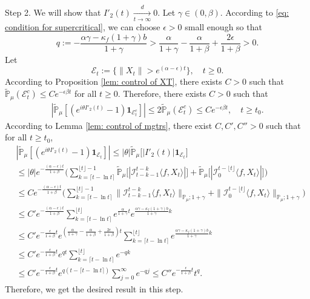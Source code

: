 \documentclass[12pt,a4paper]{amsart}
\theoremstyle{plain}
\theoremstyle{definition}
\numberwithin{equation}{section}
\begin{document}
	Step 2.
	We will show that $I'_2(t)\xrightarrow[t\to \infty]{d} 0$.
	Let $\gamma \in (0,\beta)$.
	According to \eqref{eq: condition for supercritical}, we can choose $\epsilon > 0$ small enough so that
\[
	q:= - \frac{\alpha \gamma-\kappa_f(1+\gamma)b}{1+\gamma}
	> \frac{\alpha}{1+\gamma}-\frac{\alpha}{1+\beta} + \frac{2\epsilon}{1+\beta} > 0.
\]
	Let
\[
	\mathcal E_t
	:=\{\|X_t\|>e^{(\alpha-\epsilon )t}\},
	\quad t\geq 0.
\]
	According to Proposition \ref{lem: control of XT}, there exists
	$C>0$ such that  $\mathbb{\tilde{P}}_{\mu}(\mathcal E_t^c)\leq C e^{-\epsilon \beta t}$
	for all $t\geq 0$.
	Therefore, there exists $C>0$ such that
\begin{equation}\begin{split}
    |\mathbb{\tilde{P}}_{\mu}[(e^{i\theta I'_2(t)}-1)\mathbf{1}_{\mathcal{E}^{c}_t}]|
    \leq 2\mathbb{\tilde{P}}_{\mu}(\mathcal{E}^c_t)\leq Ce^{-\epsilon \beta t},
    \quad t\geq t_0.
\end{split}\end{equation}
	According to Lemma \ref{lem: control of mgtrs}, there exist $C,C',C''>0$ such that for all
	$t\ge t_0$,
\begin{align*}
    &|\mathbb{\tilde{P}}_{\mu} [ (e^{i\theta I'_2(t)}-1)\mathbf{1}_{\mathcal{E}_t}]|
    \leq |\theta| \mathbb{\tilde{P}}_{\mu} \big[ |I'_2(t)|\mathbf{1}_{\mathcal{E}_t}\big]
    \\&\leq|\theta| e^{-\frac{(\alpha - \epsilon )t}{1+\beta}} \Big(\sum_{k=\lceil t-\ln t \rceil}^{\lfloor t \rfloor - 1}\mathbb{\tilde{P}}_{\mu}\big[| \mathcal{I}_{t-k-1}^{t-k}\langle f,X_t\rangle|\big] + \mathbb{\tilde{P}}_{\mu}\big[| \mathcal{I}_{0}^{t-\lfloor t\rfloor}\langle f,X_t\rangle|\big]\Big)
    \\& \leq C  e^{-\frac{(\alpha - \epsilon )t}{1+\beta}} \Big(\sum_{k=\lceil t-\ln t \rceil}^{\lfloor t \rfloor - 1}\|\mathcal{I}_{t-k-1}^{t-k}\langle f,X_t\rangle\|_{\mathbb P_\mu; 1+\gamma} + \|\mathcal I_0^{t-\lfloor t \rfloor} \langle f, X_t\rangle\|_{\mathbb P_\mu;1+\gamma}\Big)
    \\ &\leq C'  e^{-\frac{(\alpha - \epsilon )t}{1+\beta}} \sum_{k=\lceil t-\ln t \rceil}^{\lfloor t \rfloor}e^{\frac{\alpha}{1+\gamma}t}e^{\frac{\alpha\gamma-\kappa_f(1+\gamma)b}{1+\gamma}k}\\
    &\leq C'  e^{-\frac{\epsilon}{1+\beta} t}e^{(\frac{\alpha }{1+\gamma}-\frac{\alpha }{1+\beta} + \frac{2\epsilon}{1+\beta})t} \sum_{k=\lceil t-\ln t \rceil}^{\lfloor t \rfloor}e^{\frac{\alpha\gamma-\kappa_f(1+\gamma)b}{1+\gamma}k}\\
    &\leq C'  e^{-\frac{\epsilon}{1+\beta} t} e^{qt} \sum_{k=\lceil t-\ln t \rceil}^{\lfloor t \rfloor}e^{-qk}\\
    &\leq C'  e^{-\frac{\epsilon}{1+\beta} t} e^{q(t - \lceil t - \ln t\rceil)} \sum_{j=0}^{\infty}e^{-qj}\leq C'' e^{-\frac{\epsilon}{1+\beta} t} t^q.
\end{align*}
	Therefore, we get the desired result in this step.
\end{document}
